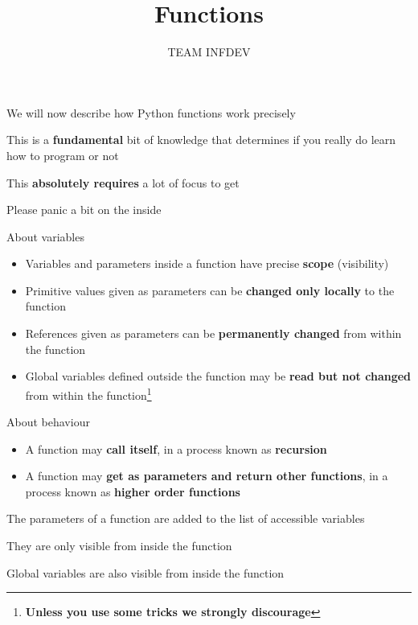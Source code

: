 \documentclass{beamer}
\title{Functions}
\author{TEAM INFDEV}
\institute{Hogeschool Rotterdam \\ 
Rotterdam, Netherlands}
\date{}
\begin{document}
\maketitle

\begin{slide}{
\item We will now describe how Python functions work precisely
\item This is a \textbf{fundamental} bit of knowledge that determines if you really do learn how to program or not
\item This \textbf{absolutely requires} a lot of focus to get
\item Please panic a bit on the inside
}\end{slide}

\begin{slide}{
\item About variables
\begin{itemize}
\item Variables and parameters inside a function have precise \textbf{scope} (visibility)
\item Primitive values given as parameters can be \textbf{changed only locally} to the function
\item References given as parameters can be \textbf{permanently changed} from within the function
\item Global variables defined outside the function may be \textbf{read but not changed} from within the function\footnote{\textbf{Unless you use some tricks we strongly discourage}}
\end{itemize}
\item About behaviour
\begin{itemize}
\item A function may \textbf{call itself}, in a process known as \textbf{recursion}
\item A function may \textbf{get as parameters and return other functions}, in a process known as \textbf{higher order functions}
\end{itemize}
}\end{slide}

\begin{slide}{
\item The parameters of a function are added to the list of accessible variables
\item They are only visible from inside the function
\item Global variables are also visible from inside the function
}\end{slide}
\end{document}
